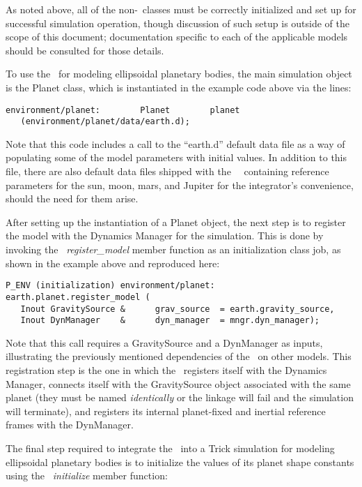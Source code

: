 As noted above, all of the non-\planetDesc\ classes must be correctly
initialized and set up for successful simulation operation, though discussion
of such setup is outside of the scope of this document; documentation specific
to each of the applicable models should be consulted for those details.

To use the \planetDesc\ for modeling ellipsoidal planetary bodies, the main
simulation object is the Planet class, which is instantiated
in the example code above via the lines:

\begin{verbatim}
environment/planet:        Planet        planet
   (environment/planet/data/earth.d);
\end{verbatim}

Note that this code includes a call to the ``earth.d'' default data file as a
way of populating some of the model parameters with initial values. In addition
to this file, there are also default data files shipped with the \JEODid\
\planetDesc\ containing reference parameters for the sun, moon, mars, and
Jupiter for the integrator's convenience, should the need for them arise.

After setting up the instantiation of a Planet object, the next step is to
register the model with the Dynamics Manager for the simulation. This is
done by invoking the \planetDesc\ {\em register\_model} member function as an
initialization class job, as shown in the example above and reproduced here:

\begin{verbatim}
P_ENV (initialization) environment/planet:
earth.planet.register_model (
   Inout GravitySource &      grav_source  = earth.gravity_source,
   Inout DynManager    &      dyn_manager  = mngr.dyn_manager);
\end{verbatim}

Note that this call requires a GravitySource and a DynManager as inputs,
illustrating the previously mentioned dependencies of the \planetDesc\ on other
models. This registration step is the one in which the \planetDesc\ registers
itself with the Dynamics Manager, connects itself with the GravitySource object
associated with the same planet (they must be named {\em identically} or the
linkage will fail and the simulation will terminate), and registers its
internal planet-fixed and inertial reference frames with the DynManager.

The final step required to integrate the \planetDesc\ into a Trick simulation
for modeling ellipsoidal planetary bodies is to initialize the
values of its planet shape constants using the
\planetDesc\ {\em initialize} member function:


